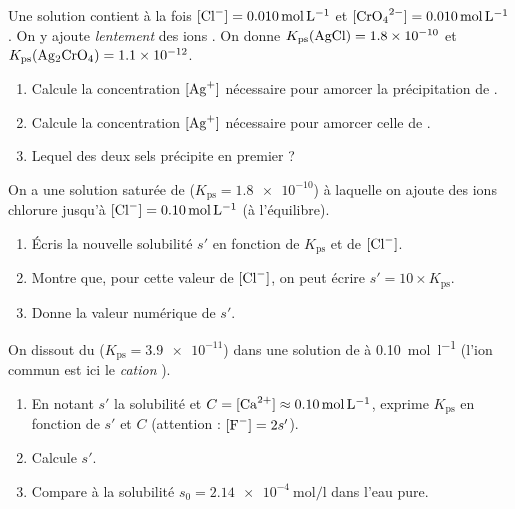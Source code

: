 \documentclass[11pt,a4paper]{article}
\begin{document}
\begin{exo}
Une solution contient à la fois $[\ce{Cl-}]=\qty{0.010}{\mole\per\litre}$ et
$[\ce{CrO4^{2-}}]=\qty{0.010}{\mole\per\litre}$. On y ajoute \emph{lentement} des ions .
On donne $K_{\mathrm{ps}}(\ce{AgCl})=\num{1.8e-10}$ et $K_{\mathrm{ps}}(\ce{Ag2CrO4})=\num{1.1e-12}$.
\begin{enumerate}[label=\alph*)]
  \item Calcule la concentration $[\ce{Ag+}]$ nécessaire pour amorcer la précipitation de .
  \item Calcule la concentration $[\ce{Ag+}]$ nécessaire pour amorcer celle de .
  \item Lequel des deux sels précipite en premier ?
\end{enumerate}
\end{exo}

\begin{exo}
On a une solution saturée de  ($K_{\mathrm{ps}}=\num{1.8e-10}$) à laquelle on ajoute des ions
chlorure jusqu'à $[\ce{Cl-}]=\qty{0.10}{\mole\per\litre}$ (à l'équilibre).
\begin{enumerate}[label=\alph*)]
  \item Écris la nouvelle solubilité $s'$ en fonction de $K_{\mathrm{ps}}$ et de $[\ce{Cl-}]$.
  \item Montre que, pour cette valeur de $[\ce{Cl-}]$, on peut écrire $s'=10\times K_{\mathrm{ps}}$.
  \item Donne la valeur numérique de $s'$.
\end{enumerate}
\end{exo}

\begin{exo}
On dissout du  ($K_{\mathrm{ps}}=\num{3.9e-11}$) dans une solution de  à
\qty{0.10}{\mole\per\litre} (l'ion commun est ici le \emph{cation} ).
\begin{enumerate}[label=\alph*)]
  \item En notant $s'$ la solubilité et $C=[\ce{Ca^{2+}}]\approx\qty{0.10}{\mole\per\litre}$, exprime
        $K_{\mathrm{ps}}$ en fonction de $s'$ et $C$ (attention : $[\ce{F-}]=2s'$).
  \item Calcule $s'$.
  \item Compare à la solubilité $s_0=\qty{2.14e-4}{\mole\per\litre}$ dans l'eau pure.
\end{enumerate}
\end{exo}
\end{document}
